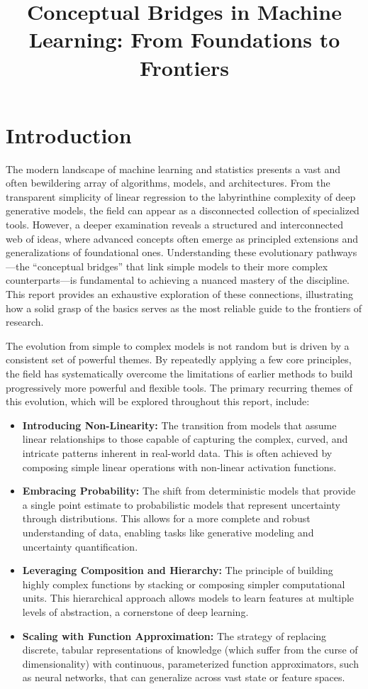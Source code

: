 \documentclass[11pt]{article}
\title{\vspace{-1em}\textbf{Conceptual Bridges in Machine Learning: From Foundations to Frontiers}}
\author{}
\date{}
\begin{document}
\maketitle

\section*{Introduction}
The modern landscape of machine learning and statistics presents a vast and often bewildering array of algorithms, models, and architectures. From the transparent simplicity of linear regression to the labyrinthine complexity of deep generative models, the field can appear as a disconnected collection of specialized tools. However, a deeper examination reveals a structured and interconnected web of ideas, where advanced concepts often emerge as principled extensions and generalizations of foundational ones. Understanding these evolutionary pathways---the ``conceptual bridges'' that link simple models to their more complex counterparts---is fundamental to achieving a nuanced mastery of the discipline. This report provides an exhaustive exploration of these connections, illustrating how a solid grasp of the basics serves as the most reliable guide to the frontiers of research.

The evolution from simple to complex models is not random but is driven by a consistent set of powerful themes. By repeatedly applying a few core principles, the field has systematically overcome the limitations of earlier methods to build progressively more powerful and flexible tools. The primary recurring themes of this evolution, which will be explored throughout this report, include:
\begin{itemize}[leftmargin=1.2em]
  \item \textbf{Introducing Non-Linearity:} The transition from models that assume linear relationships to those capable of capturing the complex, curved, and intricate patterns inherent in real-world data. This is often achieved by composing simple linear operations with non-linear activation functions.
  \item \textbf{Embracing Probability:} The shift from deterministic models that provide a single point estimate to probabilistic models that represent uncertainty through distributions. This allows for a more complete and robust understanding of data, enabling tasks like generative modeling and uncertainty quantification.
  \item \textbf{Leveraging Composition and Hierarchy:} The principle of building highly complex functions by stacking or composing simpler computational units. This hierarchical approach allows models to learn features at multiple levels of abstraction, a cornerstone of deep learning.
  \item \textbf{Scaling with Function Approximation:} The strategy of replacing discrete, tabular representations of knowledge (which suffer from the curse of dimensionality) with continuous, parameterized function approximators, such as neural networks, that can generalize across vast state or feature spaces.
\end{itemize}
\end{document}
